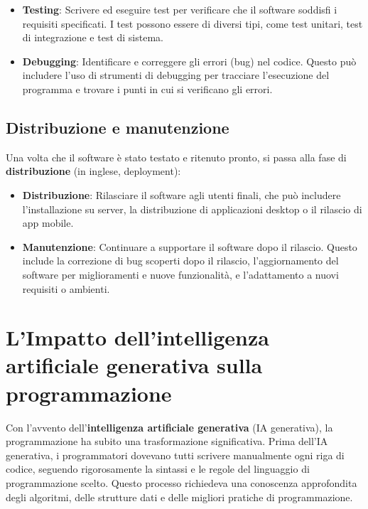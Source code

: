 \documentclass[
  letterpaper,
]{scrbook}
\providecommand{\tightlist}{%
  \setlength{\itemsep}{0pt}\setlength{\parskip}{0pt}}\usepackage{longtable,booktabs,array}
\begin{document}
\begin{itemize}
\tightlist
\item
  \textbf{Testing}: Scrivere ed eseguire test per verificare che il
  software soddisfi i requisiti specificati. I test possono essere di
  diversi tipi, come test unitari, test di integrazione e test di
  sistema.
\item
  \textbf{Debugging}: Identificare e correggere gli errori (bug) nel
  codice. Questo può includere l'uso di strumenti di debugging per
  tracciare l'esecuzione del programma e trovare i punti in cui si
  verificano gli errori.
\end{itemize}

\subsection{Distribuzione e
manutenzione}\label{distribuzione-e-manutenzione}

Una volta che il software è stato testato e ritenuto pronto, si passa
alla fase di \textbf{distribuzione} (in inglese, deployment):

\begin{itemize}
\tightlist
\item
  \textbf{Distribuzione}: Rilasciare il software agli utenti finali, che
  può includere l'installazione su server, la distribuzione di
  applicazioni desktop o il rilascio di app mobile.
\item
  \textbf{Manutenzione}: Continuare a supportare il software dopo il
  rilascio. Questo include la correzione di bug scoperti dopo il
  rilascio, l'aggiornamento del software per miglioramenti e nuove
  funzionalità, e l'adattamento a nuovi requisiti o ambienti.
\end{itemize}

\section{L'Impatto dell'intelligenza artificiale generativa sulla
programmazione}\label{limpatto-dellintelligenza-artificiale-generativa-sulla-programmazione}

Con l'avvento dell'\textbf{intelligenza artificiale generativa} (IA
generativa), la programmazione ha subito una trasformazione
significativa. Prima dell'IA generativa, i programmatori dovevano tutti
scrivere manualmente ogni riga di codice, seguendo rigorosamente la
sintassi e le regole del linguaggio di programmazione scelto. Questo
processo richiedeva una conoscenza approfondita degli algoritmi, delle
strutture dati e delle migliori pratiche di programmazione.
\end{document}
